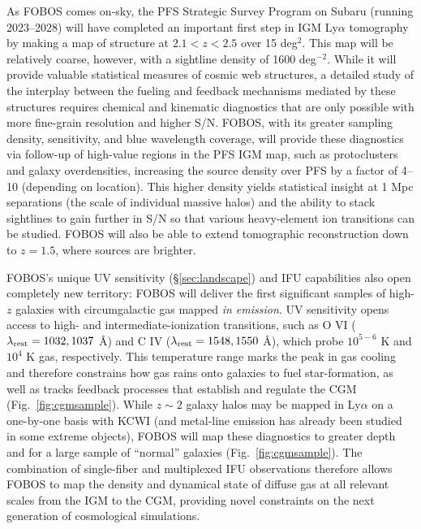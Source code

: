 \documentclass[11pt,a4paper,twoside,onecolumn,openany,final,oldfontcommands]{memoir}
\begin{document}
As FOBOS comes on-sky, the PFS Strategic Survey Program on Subaru (running 2023--2028) will have completed an important first step in IGM Ly$\alpha$ tomography by making a map of structure at $2.1 < z < 2.5$ over 15 deg$^2$.  This map will be relatively coarse, however, with a sightline density of 1600 deg$^{-2}$.  While it will provide valuable statistical measures of cosmic web structures, a detailed study of the interplay between the fueling and feedback mechanisms mediated by these structures requires chemical and kinematic diagnostics that are only possible with more fine-grain resolution and higher S/N.  FOBOS, with its greater sampling density, sensitivity, and blue wavelength coverage, will provide these diagnostics via follow-up of high-value regions in the PFS IGM map, such as protoclusters and galaxy overdensities, increasing the source density over PFS by a factor of 4--10 (depending on location).  This higher density yields statistical insight at 1 Mpc separations (the scale of individual massive halos) and the ability to stack sightlines to gain further in S/N so that various heavy-element ion transitions can be studied.  FOBOS will also be able to extend tomographic reconstruction down to $z = 1.5$, where sources are brighter.

FOBOS's unique UV sensitivity (\S \ref{sec:landscape}) and IFU capabilities also open completely new territory: FOBOS will deliver the first significant samples of high-$z$ galaxies with circumgalactic gas mapped \emph{in emission}. UV sensitivity opens access to high- and intermediate-ionization transitions, such as O VI ($\lambda_{\rm rest} = 1032, 1037$ \AA) and C IV ($\lambda_{\rm rest} = 1548, 1550$ \AA), which probe $10^{5-6}$ K and $10^4$ K gas, respectively.  This temperature range marks the peak in gas cooling and therefore constrains how gas rains onto galaxies to fuel star-formation, as well as tracks feedback processes that establish and regulate the CGM (Fig.~\ref{fig:cgmsample}).  While $z\sim2$ galaxy halos may be mapped in Ly$\alpha$ on a one-by-one basis with KCWI (and metal-line emission has already been studied in some extreme objects), FOBOS will map these diagnostics to greater depth and for a large sample of ``normal'' galaxies (Fig.~\ref{fig:cgmsample}).  The combination of single-fiber and multiplexed IFU observations therefore allows FOBOS to map the density and dynamical state of diffuse gas at all relevant scales from the IGM to the CGM, providing novel constraints on the next generation of cosmological simulations.
\end{document}
